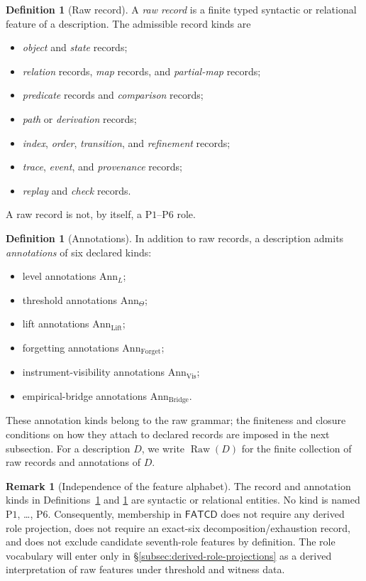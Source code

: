 \documentclass[11pt]{article}
\theoremstyle{definition}
\newtheorem{definition}[theorem]{Definition}
\newtheorem{remark}[theorem]{Remark}
\newcommand{\FATCD}{\ensuremath{\mathsf{FATCD}}}
\newcommand{\Raw}[1]{\ensuremath{\operatorname{Raw}\!\left(#1\right)}}
\newcommand{\Pone}{\ensuremath{\mathrm{P1}}}
\newcommand{\Psix}{\ensuremath{\mathrm{P6}}}
\begin{document}
\begin{definition}[Raw record]\label{def:raw-record}
A \emph{raw record} is a finite typed syntactic or relational feature of a
description. The admissible record kinds are
\begin{itemize}[topsep=2pt,itemsep=1pt]
  \item \emph{object} and \emph{state} records;
  \item \emph{relation} records, \emph{map} records, and \emph{partial-map}
    records;
  \item \emph{predicate} records and \emph{comparison} records;
  \item \emph{path} or \emph{derivation} records;
  \item \emph{index}, \emph{order}, \emph{transition}, and \emph{refinement}
    records;
  \item \emph{trace}, \emph{event}, and \emph{provenance} records;
  \item \emph{replay} and \emph{check} records.
\end{itemize}
A raw record is not, by itself, a \Pone{}--\Psix{} role.
\end{definition}

\begin{definition}[Annotations]\label{def:annotations}
In addition to raw records, a description admits \emph{annotations} of six
declared kinds:
\begin{itemize}[topsep=2pt,itemsep=1pt]
  \item level annotations \(\mathrm{Ann}_L\);
  \item threshold annotations \(\mathrm{Ann}_\Theta\);
  \item lift annotations \(\mathrm{Ann}_{\mathrm{Lift}}\);
  \item forgetting annotations \(\mathrm{Ann}_{\mathrm{Forget}}\);
  \item instrument-visibility annotations \(\mathrm{Ann}_{\mathrm{Vis}}\);
  \item empirical-bridge annotations \(\mathrm{Ann}_{\mathrm{Bridge}}\).
\end{itemize}
These annotation kinds belong to the raw grammar; the finiteness and closure
conditions on how they attach to declared records are imposed in the next
subsection. For a description \(D\), we write \(\Raw{D}\) for the finite
collection of raw records and annotations of \(D\).
\end{definition}

\begin{remark}[Independence of the feature alphabet]\label{rem:alphabet-independence}
The record and annotation kinds in Definitions~\ref{def:raw-record} and
\ref{def:annotations} are syntactic or relational entities. No kind is named
\Pone{}, \ldots, \Psix{}. Consequently, membership in \FATCD{} does not
require any derived role projection, does not require an exact-six
decomposition/exhaustion record, and does not exclude candidate seventh-role
features by definition. The role vocabulary will enter only in
\S\ref{subsec:derived-role-projections} as a derived interpretation of raw
features under threshold and witness data.
\end{remark}
\end{document}
